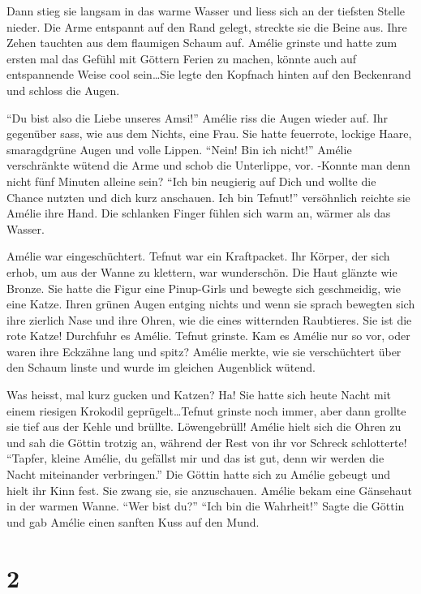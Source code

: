 \documentclass[11pt,titlepage,a5paper]{book}
\begin{document}
Dann stieg sie langsam in das warme Wasser und liess sich an der tiefsten Stelle nieder. Die Arme entspannt auf den Rand gelegt, streckte sie die Beine aus. Ihre Zehen tauchten aus dem flaumigen Schaum auf. Amélie grinste und hatte zum ersten mal das Gefühl mit Göttern Ferien zu machen, könnte auch auf entspannende Weise cool sein\dots Sie legte den Kopfnach hinten auf den Beckenrand und schloss die Augen.

"`Du bist also die Liebe unseres Amsi!"' Amélie riss die Augen wieder auf. Ihr gegenüber sass, wie aus dem Nichts, eine Frau. Sie hatte feuerrote, lockige Haare, smaragdgrüne Augen und volle Lippen. "`Nein! Bin ich nicht!"' Amélie verschränkte wütend die Arme und schob die Unterlippe, vor. -Konnte man denn nicht fünf Minuten alleine sein? "`Ich bin neugierig auf Dich und wollte die Chance nutzten und dich kurz anschauen. Ich bin Tefnut!"' versöhnlich reichte sie Amélie ihre Hand. Die schlanken Finger fühlen sich warm an, wärmer als das Wasser. 

Amélie war eingeschüchtert. Tefnut war ein Kraftpacket. Ihr Körper, der sich erhob, um aus der Wanne zu klettern, war wunderschön. Die Haut glänzte wie Bronze. Sie hatte die Figur eine Pinup-Girls und bewegte sich geschmeidig, wie eine Katze. Ihren grünen Augen entging nichts und wenn sie sprach bewegten sich ihre zierlich Nase und ihre Ohren, wie die eines witternden Raubtieres. Sie ist die rote Katze! Durchfuhr es Amélie. Tefnut grinste. Kam es Amélie nur so vor, oder waren ihre Eckzähne lang und spitz? Amélie merkte, wie sie verschüchtert über den Schaum linste und wurde im gleichen Augenblick wütend. 

Was heisst, mal kurz gucken und Katzen? Ha! Sie hatte sich heute Nacht mit einem riesigen Krokodil geprügelt\dots Tefnut grinste noch immer, aber dann grollte sie tief aus der Kehle und brüllte. Löwengebrüll! Amélie hielt sich die Ohren zu und sah die Göttin trotzig an, während der Rest von ihr vor Schreck schlotterte! "`Tapfer, kleine Amélie, du gefällst mir und das ist gut, denn wir werden die Nacht miteinander verbringen."' Die Göttin hatte sich zu Amélie gebeugt und hielt ihr Kinn fest. Sie zwang sie, sie anzuschauen. Amélie bekam eine Gänsehaut in der warmen Wanne. "`Wer bist du?"' "`Ich bin die Wahrheit!"' Sagte die Göttin und gab Amélie einen sanften Kuss auf den Mund.

\section*{2}
\end{document}
